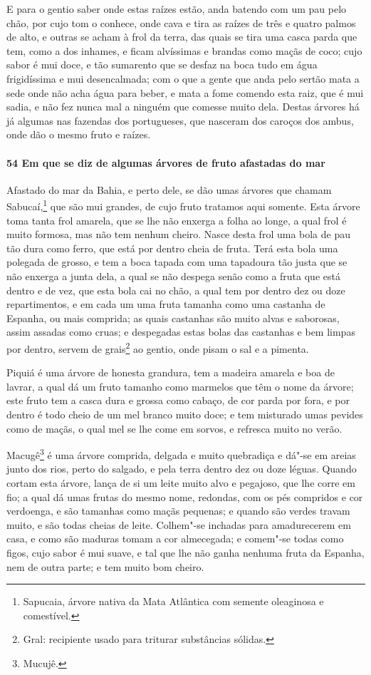 \begin{linenumbers}
E para o gentio saber onde estas raízes estão, anda batendo com um pau pelo chão, por cujo
tom o conhece, onde cava e tira as raízes de três e quatro palmos de alto, e outras se
acham à frol da terra, das quais se tira uma casca parda que tem, como a dos inhames, e
ficam alvíssimas e brandas como maçãs de coco; cujo sabor é mui doce, e tão sumarento que
se desfaz na boca tudo em água frigidíssima e mui desencalmada; com o que a gente que anda
pelo sertão mata a sede onde não acha água para beber, e mata a fome comendo esta raiz,
que é mui sadia, e não fez nunca mal a ninguém que comesse muito dela. Destas árvores há
já algumas nas fazendas dos portugueses, que nasceram dos caroços dos ambus, onde dão o
mesmo fruto e raízes.

\paragraph{54 Em que se diz de algumas árvores de fruto afastadas do mar}\quad
Afastado do mar da Bahia, e perto dele, se dão umas árvores que chamam Sabucaí,\footnote{
Sapucaia, árvore nativa da Mata Atlântica com semente oleaginosa e comestível.} que são
mui grandes, de cujo fruto tratamos aqui somente. Esta árvore toma tanta frol amarela, que
se lhe não enxerga a folha ao longe, a qual frol é muito formosa, mas não tem nenhum
cheiro. Nasce desta frol uma bola de pau tão dura como ferro, que está por dentro cheia de
fruta. Terá esta bola uma polegada de grosso, e tem a boca tapada com uma tapadoura tão
justa que se não enxerga a junta dela, a qual se não despega senão como a fruta que está
dentro e de vez, que esta bola cai no chão, a qual tem por dentro dez ou doze
repartimentos, e em cada um uma fruta tamanha como uma castanha de Espanha, ou mais
comprida; as quais castanhas são muito alvas e saborosas, assim assadas como cruas; e
despegadas estas bolas das castanhas e bem limpas por dentro, servem de grais\footnote{
Gral: recipiente usado para triturar substâncias sólidas.} ao gentio, onde pisam o sal e a
pimenta.

Piquiá é uma árvore de honesta grandura, tem a madeira amarela e boa de lavrar, a qual dá
um fruto tamanho como marmelos que têm o nome da árvore; este fruto tem a casca dura e
grossa como cabaço, de cor parda por fora, e por dentro é todo cheio de um mel branco
muito doce; e tem misturado umas pevides como de maçãs, o qual mel se lhe come em sorvos,
e refresca muito no verão.

Macugê\footnote{ Mucujê.} é uma árvore comprida, delgada e muito quebradiça e dá"-se em
areias junto dos rios, perto do salgado, e pela terra dentro dez ou doze léguas. Quando
cortam esta árvore, lança de si um leite muito alvo e pegajoso, que lhe corre em fio; a
qual dá umas frutas do mesmo nome, redondas, com os pés compridos e cor verdoenga, e são
tamanhas como maçãs pequenas; e quando são verdes travam muito, e são todas cheias de
leite. Colhem"-se inchadas para amadurecerem em casa, e como são maduras tomam a cor
almecegada; e comem"-se todas como figos, cujo sabor é mui suave, e tal que lhe não ganha
nenhuma fruta da Espanha, nem de outra parte; e tem muito bom cheiro.


\end{linenumbers}
